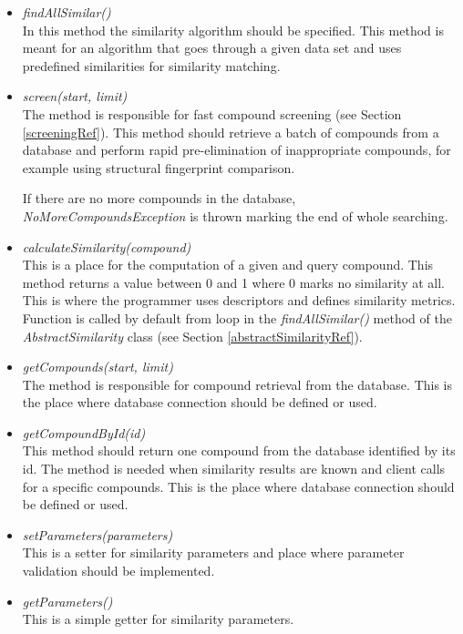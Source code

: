 \documentclass[thesis=M,english]{FITthesis}[2012/10/20]
\begin{document}
\begin{itemize}
\item \textit{findAllSimilar()} \\ In this method the similarity algorithm should be specified. This method is meant for an algorithm that goes through a given data set and uses predefined similarities for similarity matching.
\item \textit{screen(start, limit)}  \\ The method is responsible for fast compound screening (see Section \ref{screeningRef}). This method should retrieve a batch of compounds from a database and perform rapid pre-elimination of inappropriate compounds, for example using structural fingerprint comparison. 

If there are no more compounds in the database, \textit{NoMoreCompoundsException} is thrown marking the end of whole searching.

\item \textit{calculateSimilarity(compound)}  \\ This is a place for the computation of a given and query compound. This method returns a value between 0 and 1 where 0 marks no similarity at all. This is where the programmer uses descriptors and defines similarity metrics. Function is called by default from loop in the \textit{findAllSimilar()} method of the \textit{AbstractSimilarity} class (see Section \ref{abstractSimilarityRef}).

\item \textit{getCompounds(start, limit)}  \\ The method is responsible for compound retrieval from the database. This is the place where database connection should be defined or used. 

\item \textit{getCompoundById(id)}  \\ This method should return one compound from the database identified by its id. The method is needed when similarity results are known and client calls for a specific compounds. This is the place where database connection should be defined or used.

\item \textit{setParameters(parameters)}  \\ This is a setter for similarity parameters and place where parameter validation should be implemented.

\item \textit{getParameters()}  \\ This is a simple getter for similarity parameters. 


\end{itemize}
\end{document}
